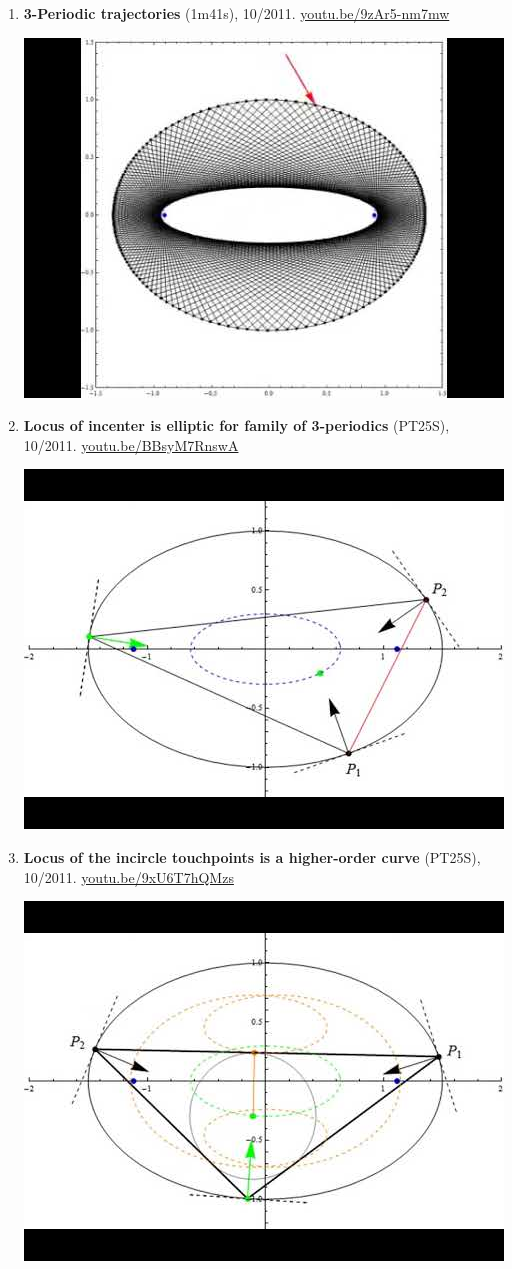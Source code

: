 \documentclass[12pt]{article}
\begin{document}
\begin{enumerate}[resume]
\item \textbf{3-Periodic trajectories} (1m41s), 10/2011. \href{https://youtu.be/9zAr5-nm7mw}{\url{youtu.be/9zAr5-nm7mw}}
\begin{center}\includegraphics[width=.5\textwidth]{pics/9zAr5-nm7mw.jpg}\end{center}
% 
\item \textbf{Locus of incenter is elliptic for family of 3-periodics} (PT25S), 10/2011. \href{https://youtu.be/BBsyM7RnswA}{\url{youtu.be/BBsyM7RnswA}}
\begin{center}\includegraphics[width=.5\textwidth]{pics/BBsyM7RnswA.jpg}\end{center}
% 
\item \textbf{Locus of the incircle touchpoints is a higher-order curve} (PT25S), 10/2011. \href{https://youtu.be/9xU6T7hQMzs}{\url{youtu.be/9xU6T7hQMzs}}
\begin{center}\includegraphics[width=.5\textwidth]{pics/9xU6T7hQMzs.jpg}\end{center}
% 
\end{enumerate}
\end{document}
